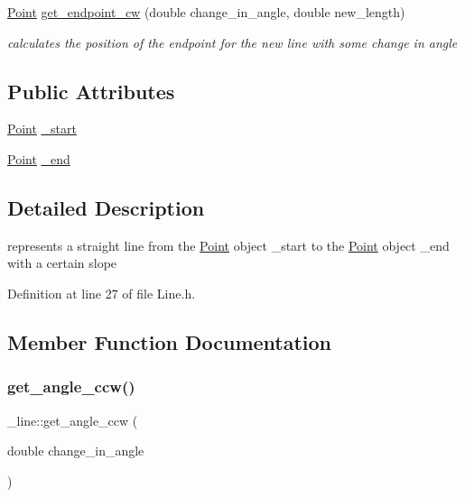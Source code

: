 \begin{DoxyCompactItemize}
\mbox{\hyperlink{struct_point}{Point}} \mbox{\hyperlink{struct__line_ac56b4f2909b66eb14910421a4589aca4}{get\+\_\+endpoint\+\_\+cw}} (double change\+\_\+in\+\_\+angle, double new\+\_\+length)
\begin{DoxyCompactList}\small\item\em calculates the position of the endpoint for the new line with some change in angle \end{DoxyCompactList}\end{DoxyCompactItemize}
\subsection*{Public Attributes}
\begin{DoxyCompactItemize}
\item 
\mbox{\hyperlink{struct_point}{Point}} \mbox{\hyperlink{struct__line_a21249c64d9d4f9818059a9c99943df4b}{\+\_\+start}}
\item 
\mbox{\hyperlink{struct_point}{Point}} \mbox{\hyperlink{struct__line_a081e0006fa57d07bfb8ef30b5056a58a}{\+\_\+end}}
\end{DoxyCompactItemize}


\subsection{Detailed Description}
represents a straight line from the \mbox{\hyperlink{struct_point}{Point}} object \+\_\+start to the \mbox{\hyperlink{struct_point}{Point}} object \+\_\+end with a certain slope 

Definition at line 27 of file Line.\+h.



\subsection{Member Function Documentation}
\mbox{\label{struct__line_ae49c65726376062a08113a96fcda65d6}} 
\subsubsection{\texorpdfstring{get\_angle\_ccw()}{get\_angle\_ccw()}}
{\footnotesize\ttfamily \+\_\+line\+::get\+\_\+angle\+\_\+ccw (\begin{DoxyParamCaption}\item[{double}]{change\+\_\+in\+\_\+angle }\end{DoxyParamCaption})\hspace{0.3cm}{\ttfamily [inline]}}



